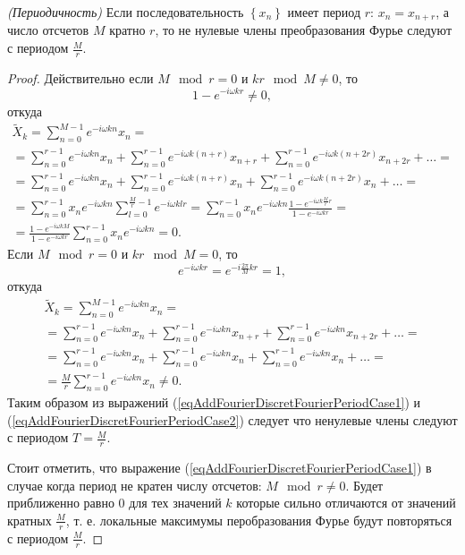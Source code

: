 \begin{lemma}
\emph{(Периодичность)}
\label{lemmaAddFourierDiscretFourierPeriod}
Если последовательность $\left\{x_n\right\}$ имеет период $r$: $x_n =
x_{n + r}$, а число отсчетов $M$ кратно $r$, то не нулевые члены
преобразования Фурье следуют с периодом $\frac{M}{r}$.
\end{lemma}

\begin{proof}
Действительно если $M \mod r = 0$ и $k r \mod M \ne 0$,
то
\[
1 - e^{-i \omega k r} \ne 0,
\]
откуда
\begin{eqnarray}
\tilde{X}_k = \sum_{n = 0}^{M - 1}e^{-i \omega k n}x_n = 
\nonumber \\
=
\sum_{n = 0}^{r - 1}e^{-i \omega k n} x_n + 
\sum_{n = 0}^{r - 1}e^{-i \omega k \left(n + r \right) } x_{n+r} + 
\sum_{n = 0}^{r - 1}e^{-i \omega k \left(n + 2r \right) } x_{n+2r} + 
\dots =
\nonumber \\
=
\sum_{n = 0}^{r - 1}e^{-i \omega k n} x_n + 
\sum_{n = 0}^{r - 1}e^{-i \omega k \left(n + r \right) } x_n + 
\sum_{n = 0}^{r - 1}e^{-i \omega k \left(n + 2r \right) } x_n + 
\dots =
\nonumber \\
= \sum_{n = 0}^{r - 1} x_n e^{-i \omega k n} 
\sum_{l = 0}^{\frac{M}{r}- 1} e^{-i \omega k l r } = 
\sum_{n = 0}^{r - 1} x_n e^{-i \omega k n} 
\frac{1 - e^{-i \omega k \frac{M}{r} r }}{1 - e^{-i \omega k r }} = 
\nonumber \\
=
\frac{1 - e^{-i \omega k M }}{1 - e^{-i \omega k r}}
\sum_{n = 0}^{r - 1} x_n e^{-i \omega k n} = 0.
\label{eqAddFourierDiscretFourierPeriodCase1}
\end{eqnarray}
Если $M \mod r = 0$ и $k r \mod M = 0$, то
\[
e^{-i \omega k r } = e^{-i \frac{2 \pi }{M} k r } = 1,
\]
откуда
\begin{eqnarray}
\tilde{X}_k = \sum_{n = 0}^{M - 1}e^{-i \omega k n}x_n = 
\nonumber \\
=
\sum_{n = 0}^{r - 1}e^{-i \omega k n} x_n + 
\sum_{n = 0}^{r - 1}e^{-i \omega k n } x_{n+r} + 
\sum_{n = 0}^{r - 1}e^{-i \omega k n } x_{n+2r} + 
\dots =
\nonumber \\
=
\sum_{n = 0}^{r - 1}e^{-i \omega k n} x_n + 
\sum_{n = 0}^{r - 1}e^{-i \omega k n  } x_n + 
\sum_{n = 0}^{r - 1}e^{-i \omega k n  } x_n + 
\dots = 
\nonumber \\ 
= \frac{M}{r} \sum_{n = 0}^{r - 1}e^{-i \omega k n  } x_n \ne 0.
\label{eqAddFourierDiscretFourierPeriodCase2}
\end{eqnarray}
Таким образом из выражений 
(\ref{eqAddFourierDiscretFourierPeriodCase1}) и 
(\ref{eqAddFourierDiscretFourierPeriodCase2}) следует что
ненулевые члены следуют с периодом $T = \frac{M}{r}$.

Стоит отметить, что выражение 
(\ref{eqAddFourierDiscretFourierPeriodCase1}) в случае когда
период не кратен числу отсчетов: $M \mod r \ne 0$. Будет приближенно
равно 0 для тех значений $k$ которые сильно отличаются от значений
кратных $\frac{M}{r}$, т. е. локальные максимумы перобразования Фурье
будут повторяться с периодом $\frac{M}{r}$.
\end{proof}

